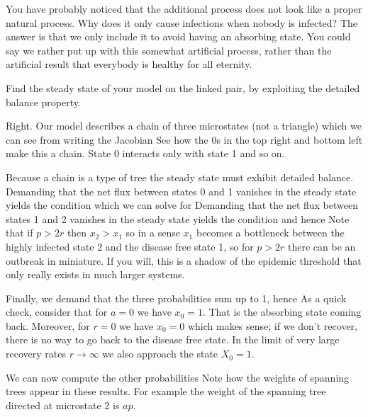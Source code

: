 You have probably noticed that the additional process does not look like a proper natural process. Why does it only cause infections when nobody is infected? The answer is that we only include it to avoid having an absorbing state. You could say we rather put up with this somewhat artificial process, rather than the artificial result that everybody is healthy for all eternity.   

\subquestion 
Find the steady state of your model on the linked pair, by exploiting the detailed balance property. 

\solution 
Right. Our model describes a chain of three microstates (not a triangle) which we can see from writing the Jacobian 
See how the 0s in the top right and bottom left make this a chain. State 0 interacts only with state 1 and so on. 

Because a chain is a type of tree the steady state must exhibit detailed balance. Demanding that the net flux between states 0 and 1 vanishes in the steady state yields the condition 
which we can solve for 
Demanding that the net flux between states 1 and 2 vanishes in the steady state yields the condition 
and hence 
Note that if $p>2r$ then $x_2>x_1$ so in a sense $x_1$ becomes a bottleneck between the highly infected state 2 and the disease free state 1, so for $p>2r$ there can be an outbreak in miniature. If you will, this is a shadow of the epidemic threshold that only really exists in much larger systems. 

Finally, we demand that the three probabilities sum up to 1,
hence 
As a quick check, consider that for $a=0$ we have $x_0=1$. That is the absorbing state coming back. Moreover, for $r=0$ we have $x_0=0$ which makes sense; if we don't recover, there is no way to go back to the disease free state. In the limit of very large recovery rates $r\to \infty$ we also approach the state $X_0 = 1$. 

We can now compute the other probabilities 
Note how the weights of spanning trees appear in these results. For example the weight of the spanning tree directed at microstate 2 is $ap$. 

